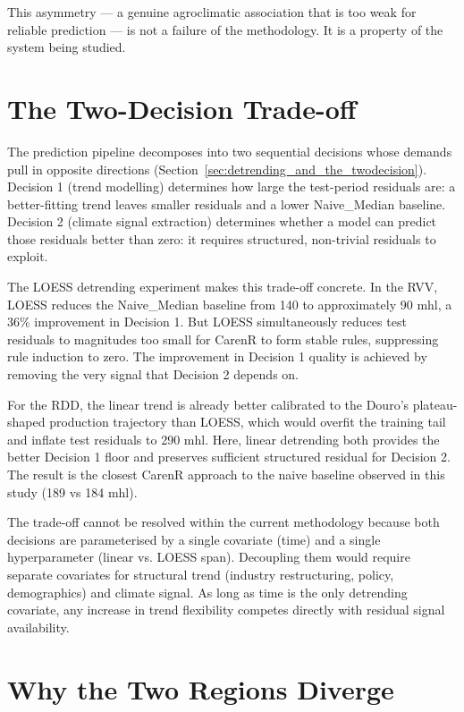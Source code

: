 This asymmetry --- a genuine agroclimatic association that is too weak for reliable prediction --- is not a failure of the methodology. It is a property of the system being studied.


\section{The Two-Decision Trade-off}\label{sec:the_twodecision_tradeoff}

The prediction pipeline decomposes into two sequential decisions whose demands pull in opposite directions (Section~\ref{sec:detrending_and_the_twodecision}). Decision 1 (trend modelling) determines how large the test-period residuals are: a better-fitting trend leaves smaller residuals and a lower Naive\_Median baseline. Decision 2 (climate signal extraction) determines whether a model can predict those residuals better than zero: it requires structured, non-trivial residuals to exploit.

The LOESS detrending experiment makes this trade-off concrete. In the RVV, LOESS reduces the Naive\_Median baseline from 140 to approximately 90 mhl, a 36\% improvement in Decision 1. But LOESS simultaneously reduces test residuals to magnitudes too small for CarenR to form stable rules, suppressing rule induction to zero. The improvement in Decision 1 quality is achieved by removing the very signal that Decision 2 depends on.

For the RDD, the linear trend is already better calibrated to the Douro's plateau-shaped production trajectory than LOESS, which would overfit the training tail and inflate test residuals to 290 mhl. Here, linear detrending both provides the better Decision 1 floor and preserves sufficient structured residual for Decision 2. The result is the closest CarenR approach to the naive baseline observed in this study (189 vs 184 mhl).

The trade-off cannot be resolved within the current methodology because both decisions are parameterised by a single covariate (time) and a single hyperparameter (linear vs. LOESS span). Decoupling them would require separate covariates for structural trend (industry restructuring, policy, demographics) and climate signal. As long as time is the only detrending covariate, any increase in trend flexibility competes directly with residual signal availability.


\section{Why the Two Regions Diverge}\label{sec:why_the_two_regions}

